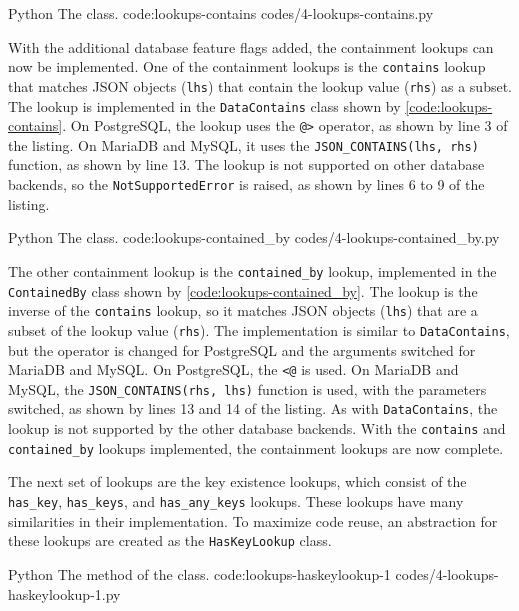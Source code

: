 \listing
{Python}
{The  class.}
{code:lookups-contains}
{codes/4-lookups-contains.py}

With the additional database feature flags added, the containment lookups can
now be implemented. One of the containment lookups is the \verb|contains|
lookup that matches JSON objects (\verb|lhs|) that contain the lookup value
(\verb|rhs|) as a subset. The lookup is implemented in the \verb|DataContains|
class shown by \autoref{code:lookups-contains}. On PostgreSQL, the lookup uses
the \verb|@>| operator, as shown by line 3 of the listing. On MariaDB and
MySQL, it uses the \verb|JSON_CONTAINS(lhs, rhs)| function, as shown by line
13. The lookup is not supported on other database backends, so the
\verb|NotSupportedError| is raised, as shown by lines 6 to 9 of the listing.

\listing
{Python}
{The  class.}
{code:lookups-contained_by}
{codes/4-lookups-contained_by.py}

The other containment lookup is the \verb|contained_by| lookup, implemented in
the \verb|ContainedBy| class shown by \autoref{code:lookups-contained_by}. The
lookup is the inverse of the \verb|contains| lookup, so it matches JSON objects
(\verb|lhs|) that are a subset of the lookup value (\verb|rhs|). The
implementation is similar to \verb|DataContains|, but the operator is changed
for PostgreSQL and the arguments switched for MariaDB and MySQL. On PostgreSQL,
the \verb|<@| is used. On MariaDB and MySQL, the \verb|JSON_CONTAINS(rhs, lhs)|
function is used, with the parameters switched, as shown by lines 13 and 14 of
the listing. As with \verb|DataContains|, the lookup is not supported by the
other database backends. With the \verb|contains| and \verb|contained_by|
lookups implemented, the containment lookups are now complete.

The next set of lookups are the key existence lookups, which consist of the
\verb|has_key|, \verb|has_keys|, and \verb|has_any_keys| lookups. These
lookups have many similarities in their implementation. To maximize code reuse,
an abstraction for these lookups are created as the \verb|HasKeyLookup| class.

\listing
{Python}
{The  method of the  class.}
{code:lookups-haskeylookup-1}
{codes/4-lookups-haskeylookup-1.py}

